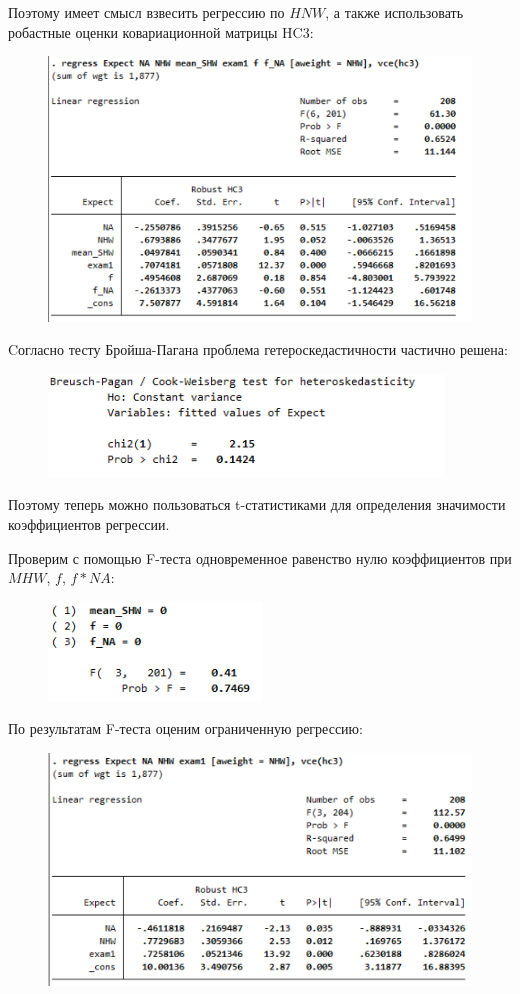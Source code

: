 \documentclass[12pt,a4paper, oneside]{extreport}
\begin{document}
Поэтому имеет смысл взвесить регрессию по $HNW$, а также использовать робастные оценки ковариационной матрицы HC3:

\begin{figure}[h!]
	\centering
	\includegraphics[width=0.7\linewidth]{screenshot010}
	\label{fig:screenshot010}
\end{figure}


Cогласно тесту Бройша-Пагана проблема гетероскедастичности частично решена:

\begin{figure}[h!]
	\centering
	\includegraphics{screenshot011}
	\label{fig:screenshot011}
\end{figure}

Поэтому теперь можно пользоваться t-статистиками для определения значимости коэффициентов регрессии. 

Проверим с помощью F-теста одновременное равенство нулю коэффициентов при $MHW$, $f$, $f*NA$:

\begin{figure}[h!]
	\centering
	\includegraphics{screenshot012}
	\label{fig:screenshot012}
\end{figure}

По результатам F-теста оценим ограниченную регрессию:

\begin{figure}[h!]
	\centering
	\includegraphics[width=0.7\linewidth]{screenshot013}
	\label{fig:screenshot013}
\end{figure}
\end{document}
